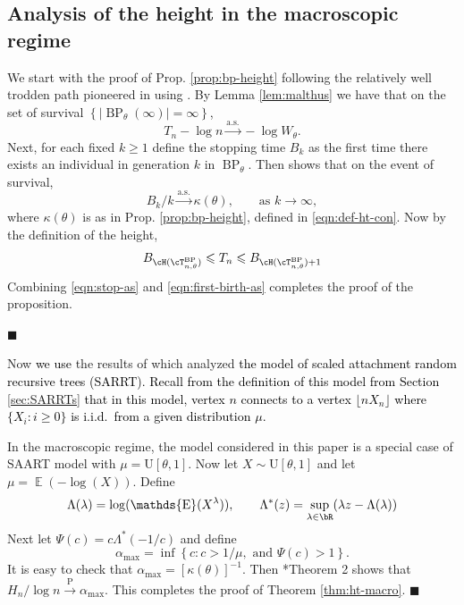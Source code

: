 \documentclass[letterpaper,11pt,reqno]{amsart}
\newtheorem{defn}[thm]{Definition}
\theoremstyle{definition}
\renewcommand{\leq}{\leqslant}
\renewcommand{\geq}{\geqslant}
\newcommand{\set}[1]{\left\{#1\right\}}
\newcommand{\probc}{\stackrel{\mathrm{P}}{\longrightarrow}}
\def\qed{ \hfill $\blacksquare$}
\DeclareMathOperator{\E}{\mathds{E}}
\newcommand{\convas}{\stackrel{\mathrm{a.s.}}{\longrightarrow}}
\DeclareMathOperator{\BP}{BP}
\begin{document}
\subsection{Analysis of the height in the macroscopic regime}
We start with the proof of Prop. \ref{prop:bp-height} following the relatively well trodden path pioneered in \cite{pittel1994note} using \cite{kingman1975first}. By Lemma \ref{lem:malthus} we have that on the set of survival $\set{|\BP_{\theta}(\infty)| = \infty}$, 
\begin{equation}
    \label{eqn:stop-as}
    T_n - \log{n} \convas -\log{W_\theta}. 
\end{equation}
Next, for each fixed $k\geq 1$ define the stopping time $B_k$ as the first time there exists an individual in generation $k$ in $\BP_\theta$. Then \cite{kingman1975first} shows that on the event of survival, 
\begin{equation}
    \label{eqn:first-birth-as}
    B_k/k\convas \kappa(\theta), \qquad \text{as } k\to\infty,
\end{equation}
where $\kappa(\theta)$ is as in Prop. \ref{prop:bp-height}, defined in \eqref{eqn:def-ht-con}. Now by the definition of the height, 
\[B_{\cH(\cT_{n,\theta}^{\BP})} \leq T_n \leq B_{\cH(\cT_{n,\theta}^{\BP})+1} \]
Combining \eqref{eqn:stop-as} and \eqref{eqn:first-birth-as} completes the proof of the proposition. 

\qed

Now \textcolor{black}{we use} the results of \cite{devroye2012depth} which analyzed \textcolor{black}{the model of scaled attachment random recursive trees (SARRT). Recall from the definition of this model from Section \ref{sec:SARRTs} that in this model, vertex $n$ connects to a vertex $\lfloor n X_n \rfloor$ where $\{X_i:i\geq 0\}$ is i.i.d.\ from a given distribution $\mu$. } %

In the macroscopic regime, the model considered in this paper is a special case of SAART model with $\mu = \text{U}[\theta , 1]$. Now let $X\sim \text{U}[\theta , 1]$ and let $\mu = \E( - \log(X))$. Define 
\begin{equation}
    \label{eqn:DFW-def}
    \Lambda(\lambda) = \log(\E(X^\lambda)), \qquad \Lambda^*(z) = \sup_{\lambda \in \bR}(\lambda z - \Lambda(\lambda))
\end{equation}
Next let $\Psi(c) = c\Lambda^*(-1/c)$ and define 
\begin{equation}
    \label{eqn:alpha-max}
    \alpha_{\max} = \inf\set{c: c> 1/\mu, \text{ and } \Psi(c) > 1}.
\end{equation}
It is easy to check that $\alpha_{\max} = [\kappa(\theta)]^{-1} $. Then \cite{devroye2012depth}*{Theorem 2} shows that $H_n/\log{n} \probc \alpha_{\max}$. This completes the proof of Theorem \ref{thm:ht-macro}. \qed 
\end{document}
